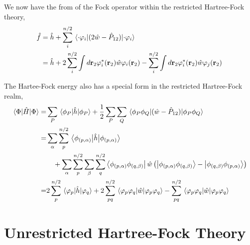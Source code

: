 We now have the from of the Fock operator within the restricted Hartree-Fock theory,
\begin{equation}
    \label{eq:RHF_fock_operator}
    \begin{aligned}
    \hat{f} &= \hat{h} + \sum_i^{n/2} \mel{\cdot\varphi_i}{(2\hat{w} - \hat{P}_{12})}{\cdot\varphi_i} \\
        &= \hat{h} + 2\sum_i^{n/2} \int d\vb{r}_2 \varphi_i^*(\vb{r}_2) \hat{w} \varphi_i(\vb{r}_2)
        -\sum_i^{n/2} \int d\vb{r}_2 \varphi_i^*(\vb{r}_2) \hat{w} \varphi_j(\vb{r}_2)
    \end{aligned}
\end{equation}

The Hartee-Fock energy also has a special form in the restricted Hartree-Fock realm,
\begin{equation}
    \begin{aligned}
        \mel{\Phi}{\hat{H}}{\Phi}
        =& \sum_P \mel{\phi_P}{\hat{h}}{\phi_P}
        + \frac{1}{2}\sum_P \sum_Q \mel{\phi_P \phi_Q}{(\hat{w} - \hat{P}_{12})}{\phi_P \phi_Q} \\
        =& \sum_\alpha \sum_p^{n/2} \mel{\phi_{(p,\alpha)}}{\hat{h}}{\phi_{(p,\alpha)}} \\
            &\quad + \sum_\alpha \sum_p^{n/2}\sum_\beta \sum_q^{n/2} 
        \bra{\phi_{(p,\alpha)}\phi_{(q,\beta)}}\hat{w}
        \left( 
            \ket{\phi_{(p,\alpha)}\phi_{(q,\beta)}} - \ket{\phi_{(q,\beta)}\phi_{(p,\alpha)}} 
        \right) \\
        =& 2\sum_p^{n/2} \mel{\varphi_p}{\hat{h}}{\varphi_q}
        + 2 \sum_{pq}^{n/2} \mel{\varphi_p\varphi_q}{\hat{w}}{\varphi_p\varphi_q}
        - \sum_{pq}^{n/2} \mel{\varphi_p\varphi_q}{\hat{w}}{\varphi_p\varphi_q}
    \end{aligned}
\end{equation}

\section{Unrestricted Hartree-Fock Theory}

